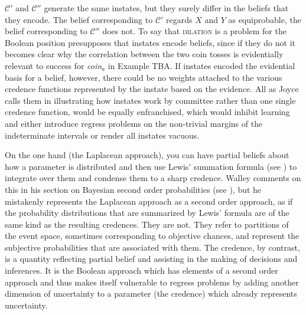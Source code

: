 \documentclass[11pt]{article}
\begin{document}

$\mathcal{C}'$ and $\mathcal{C}''$ generate the same instates, but
they surely differ in the beliefs that they encode. The belief
corresponding to $\mathcal{C}'$ regards $X$ and $Y$ as equiprobable,
the belief corresponding to $\mathcal{C}''$ does not. To say that
\textsc{dilation} is a problem for the Boolean position presupposes
that instates encode beliefs, since if they do not it becomes clear
why the correlation between the two coin tosses is evidentially
relevant to success for \textit{coin}$_{a}$ in Example TBA\tbd{}. If
instates encoded the evidential basis for a belief, however, there
could be no weights attached to the various credence functions
represented by the instate based on the evidence. All  as Joyce calls them in illustrating how instates work by
committee rather than one single credence function, would be equally
enfranchised, which would inhibit learning and either introduce
regress problems on the non-trivial margins of the indeterminate
intervals or render all instates vacuous.

On the one hand (the Laplacean approach), you can have partial beliefs
about how a parameter is distributed and then use Lewis' summation
formula (see ) to integrate over them and
condense them to a sharp credence. Walley comments on this
 in his section on Bayesian second order
probabilities (see ), but he mistakenly
represents the Laplacean approach as a second order approach, as if
the probability distributions that are summarized by Lewis' formula
are of the same kind as the resulting credences. They are not. They
refer to partitions of the event space, sometimes corresponding to
objective chances, and represent the subjective probabilities that are
associated with them. The credence, by contrast, is a quantity
reflecting partial belief and assisting in the making of decisions and
inferences. It is the Boolean approach which has elements of a second
order approach and thus makes itself vulnerable to regress problems by
adding another dimension of uncertainty to a parameter (the credence)
which already represents uncertainty.
\end{document}

